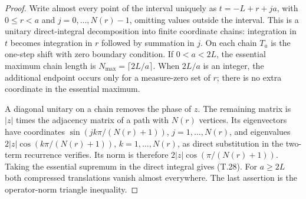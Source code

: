 \begin{proof}
Write almost every point of the interval
uniquely as
\(t=-L+r+ja\), with \(0\leq r<a\) and
\(j=0,\ldots,N(r)-1\), omitting values
outside the interval. This is a unitary
direct-integral decomposition into
finite coordinate chains: integration
in \(t\) becomes integration in \(r\)
followed by summation in \(j\).
On each chain \(T_a\) is the one-step
shift with zero boundary condition.
If \(0<a<2L\), the essential maximum
chain length is
\(N_{\max}=\lceil2L/a\rceil\).
When \(2L/a\) is an integer, the
additional endpoint occurs only
for a measure-zero set of \(r\);
there is no extra coordinate in
the essential maximum.

A diagonal unitary on a chain removes
the phase of \(z\). The remaining
matrix is \(|z|\) times the adjacency
matrix of a path with \(N(r)\)
vertices. Its eigenvectors have
coordinates
\(\sin(jk\pi/(N(r)+1))\),
\(j=1,\ldots,N(r)\), and eigenvalues
\(2|z|\cos(k\pi/(N(r)+1))\),
\(k=1,\ldots,N(r)\), as direct
substitution in the two-term
recurrence verifies. Its norm is
therefore
\(2|z|\cos(\pi/(N(r)+1))\).
Taking the essential supremum in
the direct integral gives (T.28).
For \(a\geq2L\) both compressed
translations vanish almost
everywhere. The last assertion
is the operator-norm triangle
inequality.
\end{proof}
